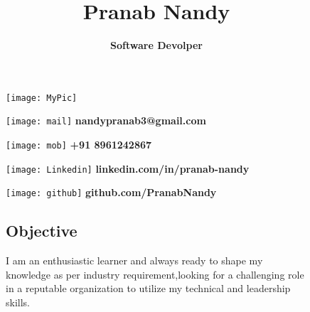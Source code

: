 \documentclass[12pt]{article}
\title{\textbf{Pranab Nandy}}
\author{\textbf{Software Devolper}}
\date{}
\begin{document}
\begin{figure}[!hbt]
\begin{minipage}{0.28\textwidth}
\texttt{[image: MyPic]}
\end{minipage}
\hfill
\begin{minipage}{0.28\textwidth}
\vspace*{-0.5in}
\maketitle
\end{minipage}

\end{figure}

\vspace*{-0.2in}
\begin{figure}[!hbt]


\begin{minipage}{0.40\textwidth}

\texttt{[image: mail]}
\textbf{nandypranab3@gmail.com}
\end{minipage}
\hfill
\begin{minipage}{0.48\textwidth}
\texttt{[image: mob]}
\textbf{+91 8961242867}
\end{minipage}
\begin{minipage}{0.48\textwidth}
	\texttt{[image: Linkedin]}
	\textbf{linkedin.com/in/pranab-nandy}
\end{minipage}
\hfill
\begin{minipage}{0.48\textwidth}
	\texttt{[image: github]}
	\textbf{github.com/PranabNandy}
\end{minipage}

\end{figure}
\hrulefill
\begin{figure}[!hbt]
\subsection*{Objective}
I am an enthusiastic learner and always ready to shape my knowledge as per industry requirement,looking for a challenging role in a reputable organization to utilize my technical and leadership skills. 
 


\end{figure}
\end{document}
